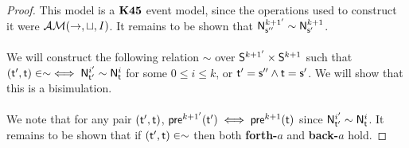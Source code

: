 \begin{proof}
  This model is a $\AXKFF$ event model, since the operations used to construct
  it were $\EM(\to,\sqcup,I)$.
  It remains to be shown that $\evM^{k+1'}_{\evs''} \sim \evM^{k+1}_{\evs'}$.\\
  \\
  We will construct the following relation $\sim$ over $\evS^{k+1'} \times
  \evS^{k+1}$ such that $(\evt',\evt) \in \sim \iff \evM^{i'}_{\evt'} \sim
  \evM^{i}_{\evt}$ for some $0 \leq i \leq k$, or $\evt' = \evs'' \land \evt =
  \evs'$.
  We will show that this is a bisimulation.\\
  \\
  We note that for any pair $(\evt',\evt)$, $\evpr^{k+1'}(\evt') \iff
  \evpr^{k+1}(\evt)$ since $\evM^{i'}_{\evt'} \sim \evM^{i}_{\evt}$.
  It remains to be shown that if $(\evt', \evt) \in \sim$ then both {\bf
  forth-$a$} and {\bf back-$a$} hold.  

\end{proof}

